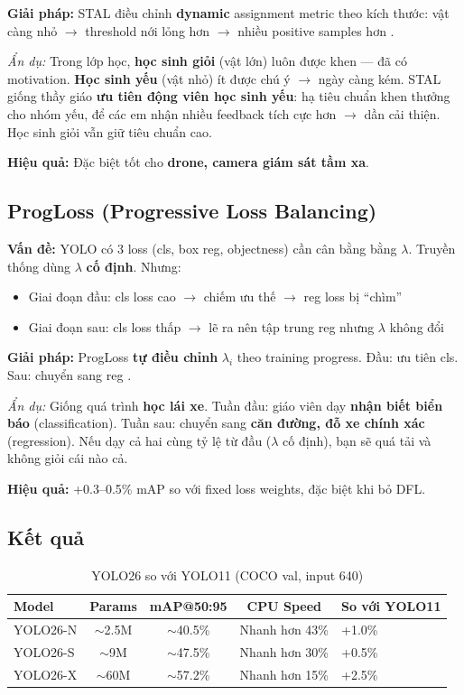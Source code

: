\textbf{Giải pháp:} STAL điều chỉnh \textbf{dynamic} assignment metric theo kích thước: vật càng nhỏ $\rightarrow$ threshold nới lỏng hơn $\rightarrow$ nhiều positive samples hơn \cite{yolo26}.

\textit{Ẩn dụ:} Trong lớp học, \textbf{học sinh giỏi} (vật lớn) luôn được khen --- đã có motivation. \textbf{Học sinh yếu} (vật nhỏ) ít được chú ý $\rightarrow$ ngày càng kém. STAL giống thầy giáo \textbf{ưu tiên động viên học sinh yếu}: hạ tiêu chuẩn khen thưởng cho nhóm yếu, để các em nhận nhiều feedback tích cực hơn $\rightarrow$ dần cải thiện. Học sinh giỏi vẫn giữ tiêu chuẩn cao.

\textbf{Hiệu quả:} Đặc biệt tốt cho \textbf{drone, camera giám sát tầm xa}.

\subsection{ProgLoss (Progressive Loss Balancing)}
\textbf{Vấn đề:} YOLO có 3 loss (cls, box reg, objectness) cần cân bằng bằng $\lambda$. Truyền thống dùng $\lambda$ \textbf{cố định}. Nhưng:
\begin{itemize}
    \item Giai đoạn đầu: cls loss cao $\rightarrow$ chiếm ưu thế $\rightarrow$ reg loss bị ``chìm''
    \item Giai đoạn sau: cls loss thấp $\rightarrow$ lẽ ra nên tập trung reg nhưng $\lambda$ không đổi
\end{itemize}

\textbf{Giải pháp:} ProgLoss \textbf{tự điều chỉnh} $\lambda_i$ theo training progress. Đầu: ưu tiên cls. Sau: chuyển sang reg \cite{yolo26}.

\textit{Ẩn dụ:} Giống quá trình \textbf{học lái xe}. Tuần đầu: giáo viên dạy \textbf{nhận biết biển báo} (classification). Tuần sau: chuyển sang \textbf{căn đường, đỗ xe chính xác} (regression). Nếu dạy cả hai cùng tỷ lệ từ đầu ($\lambda$ cố định), bạn sẽ quá tải và không giỏi cái nào cả.

\textbf{Hiệu quả:} +0.3--0.5\% mAP so với fixed loss weights, đặc biệt khi bỏ DFL.

\subsection{Kết quả}
\begin{table}[H]\centering
\caption{YOLO26 so với YOLO11 (COCO val, input 640)}
\begin{tabular}{lcccl}\toprule
\textbf{Model} & \textbf{Params} & \textbf{mAP@50:95} & \textbf{CPU Speed} & \textbf{So với YOLO11}\\\midrule
YOLO26-N & $\sim$2.5M & $\sim$40.5\% & Nhanh hơn 43\% & +1.0\% \\
YOLO26-S & $\sim$9M & $\sim$47.5\% & Nhanh hơn 30\% & +0.5\% \\
YOLO26-X & $\sim$60M & $\sim$57.2\% & Nhanh hơn 15\% & +2.5\% \\\bottomrule
\end{tabular}
\end{table}

